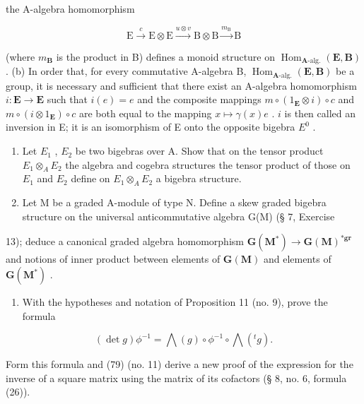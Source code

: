 the A-algebra homomorphism

\[
\mathrm{E} \xrightarrow {c} \mathrm{E} \otimes \mathrm{E} \xrightarrow {u \otimes v} \mathrm{B} \otimes \mathrm{B} \xrightarrow {m _ {\mathrm{B}}} \mathrm{B}
\]

(where \(m_{\mathbf{B}}\) is the product in B) defines a monoid structure on \(\operatorname{Hom}_{\mathbf{A}\text{-alg.}}(\mathbf{E}, \mathbf{B})\) . (b) In order that, for every commutative A-algebra B, \(\operatorname{Hom}_{\mathbf{A}\text{-alg.}}(\mathbf{E}, \mathbf{B})\) be a group, it is necessary and sufficient that there exist an A-algebra homomorphism \(i: \mathbf{E} \to \mathbf{E}\) such that \(i(e) = e\) and the composite mappings \(m \circ (1_{\mathbf{E}} \otimes i) \circ c\) and \(m \circ (i \otimes 1_{\mathbf{E}}) \circ c\) are both equal to the mapping \(x \mapsto \gamma(x)e\) . \(i\) is then called an inversion in E; it is an isomorphism of E onto the opposite bigebra \(E^0\) .

\begin{enumerate}
\def\labelenumi{\arabic{enumi}.}
\setcounter{enumi}{4}
\item
  Let \(E_{1}\) , \(E_{2}\) be two bigebras over A. Show that on the tensor product \(E_{1} \otimes_{A} E_{2}\) the algebra and cogebra structures the tensor product of those on \(E_{1}\) and \(E_{2}\) define on \(E_{1} \otimes_{A} E_{2}\) a bigebra structure.
\item
  Let M be a graded A-module of type N. Define a skew graded bigebra structure on the universal anticommutative algebra G(M) (§ 7, Exercise
\end{enumerate}

13); deduce a canonical graded algebra homomorphism \(\mathbf{G}(\mathbf{M}^{*}) \to \mathbf{G}(\mathbf{M})^{*\mathbf{gr}}\) and notions of inner product between elements of \(\mathbf{G}(\mathbf{M})\) and elements of \(\mathbf{G}(\mathbf{M}^{*})\) .

\begin{enumerate}
\def\labelenumi{\arabic{enumi}.}
\setcounter{enumi}{6}
\tightlist
\item
  With the hypotheses and notation of Proposition 11 (no. 9), prove the formula
\end{enumerate}

\[
(\det g) \phi^ {- 1} = \bigwedge (g) \circ \phi^ {- 1} \circ \bigwedge (^ {t} g).
\]

Form this formula and (79) (no. 11) derive a new proof of the expression for the inverse of a square matrix using the matrix of its cofactors (§ 8, no. 6, formula (26)).

